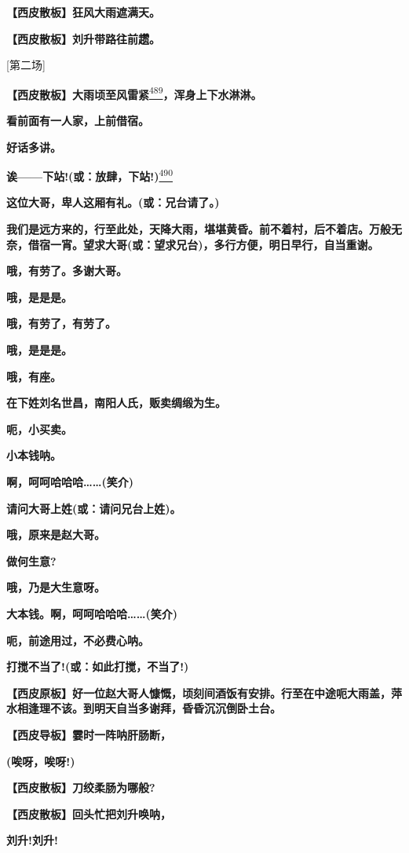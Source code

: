 \textbf{【西皮散板】狂风大雨遮满天。}

\textbf{【西皮散板】刘升带路往前趱。}

{[}第二场{]}

\textbf{【西皮散板】大雨顷至风雷紧}\protect\hyperlink{fn489}{\textsuperscript{489}}\textbf{，浑身上下水淋淋。}

\textbf{看前面有一人家，上前借宿。}

\textbf{好话多讲。}

\textbf{诶------下站!(或：放肆，下站!)}\protect\hyperlink{fn490}{\textsuperscript{490}}

\textbf{这位大哥，卑人这厢有礼。(或：兄台请了。)}

\textbf{我们是远方来的，行至此处，天降大雨，堪堪黄昏。前不着村，后不着店。万般无奈，借宿一宵。望求大哥(或：望求兄台)，多行方便，明日早行，自当重谢。}

\textbf{哦，有劳了。多谢大哥。}

\textbf{哦，是是是。}

\textbf{哦，有劳了，有劳了。}

\textbf{哦，是是是。}

\textbf{哦，有座。}

\textbf{在下姓刘名世昌，南阳人氏，贩卖绸缎为生。}

\textbf{呃，小买卖。}

\textbf{小本钱呐。}

\textbf{啊，呵呵哈哈哈\ldots{}\ldots{}(笑介)}

\textbf{请问大哥上姓(或：请问兄台上姓)。}

\textbf{哦，原来是赵大哥。}

\textbf{做何生意?}

\textbf{哦，乃是大生意呀。}

\textbf{大本钱。啊，呵呵哈哈哈\ldots{}\ldots{}(笑介)}

\textbf{呃，前途用过，不必费心呐。}

\textbf{打搅不当了!(或：如此打搅，不当了!)}

\textbf{【西皮原板】好一位赵大哥人慷慨，顷刻间酒饭有安排。行至在中途呃大雨盖，萍水相逢理不该。到明天自当多谢拜，昏昏沉沉倒卧土台。}

\textbf{【西皮导板】霎时一阵呐肝肠断，}

\textbf{(唉呀，唉呀!)}

\textbf{【西皮散板】刀绞柔肠为哪般?}

\textbf{【西皮散板】回头忙把刘升唤呐，}

\textbf{刘升!刘升!}


